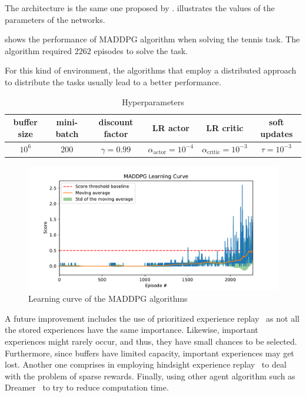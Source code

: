\documentclass[12pt,english]{article}
\begin{document}
The architecture is the same one proposed by \citeauthor{lillicrap:16}\cite{lillicrap:16}.  illustrates the values of the parameters of the networks. 

 shows the performance of MADDPG algorithm when solving the tennis task. The algorithm required \(2262\) episodes to solve the task.

For this kind of environment, the algorithms that employ a distributed approach to distribute the tasks usually lead to a better performance.

\begin{table}
\footnotesize
{
  \caption{Hyperparameters}\label{tb:parameters}
  \centering
  \begin{tabular}{cccccc}
  \toprule
    \textbf{buffer size} & \textbf{mini-batch} & \textbf{discount factor} & \textbf{LR actor} & \textbf{LR critic} & \textbf{soft updates}\\
  \midrule
   \(10^6\) & 200 & \(\gamma = 0.99\) & \(\alpha_{\text{actor}} = 10^{-4}\) & \(\alpha_{\text{critic}} = 10^{-3}\) & \(\tau=10^{-3}\)\\
  \bottomrule
  \end{tabular}
}
\end{table}

\begin{figure}%
    \centering
    \includegraphics[width=\textwidth]{maddpg_score}
    \caption{Learning curve of the MADDPG algorithms}\label{fig:score}
\end{figure}

A future improvement includes the use of prioritized experience replay~\cite{schaul:15} as not all the stored experiences have the same importance. Likewise, important experiences might rarely occur, and thus, they have small chances to be selected. Furthermore, since buffers have limited capacity, important experiences may get lost. Another one comprises in employing hindsight experience replay~\cite{andrychowicz:17} to deal with the problem of sparse rewards. Finally, using other agent algorithm such as Dreamer~\cite{hafner:20} to try to reduce computation time. 



\end{document}
